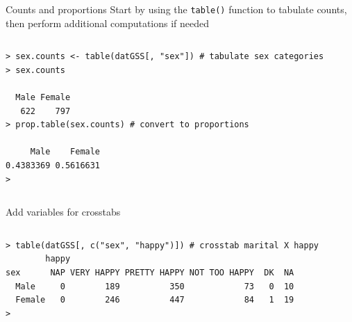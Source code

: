 \documentclass[table,smaller]{beamer}
\begin{document}
\begin{frame}[fragile,label=sec-6-2]{Counts and proportions}
 Start by using the \verb~table()~ function to tabulate counts, then perform additional computations if needed
\vspace{-.5em}
\begin{columns}
\begin{block}{}
\begin{verbatim}
> sex.counts <- table(datGSS[, "sex"]) # tabulate sex categories
> sex.counts

  Male Female 
   622    797 
> prop.table(sex.counts) # convert to proportions

     Male    Female 
0.4383369 0.5616631 
>
\end{verbatim}
\end{block}
\end{columns}
\vspace{.5em}

Add variables for crosstabs

\vspace{-.5em}
\begin{columns}
\begin{block}{}
\begin{verbatim}
> table(datGSS[, c("sex", "happy")]) # crosstab marital X happy
        happy
sex      NAP VERY HAPPY PRETTY HAPPY NOT TOO HAPPY  DK  NA
  Male     0        189          350            73   0  10
  Female   0        246          447            84   1  19
>
\end{verbatim}
\end{block}
\end{columns}
\vspace{.5em}
\end{frame}
\end{document}
